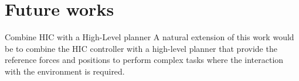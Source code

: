 \section{Future works}

\begin{frame}{Combine HIC with a High-Level planner}
  A natural extension of this work would be to combine the HIC controller
  with a high-level planner that provide the reference forces and positions to
  perform complex tasks where the interaction with the environment is required.

\end{frame}

